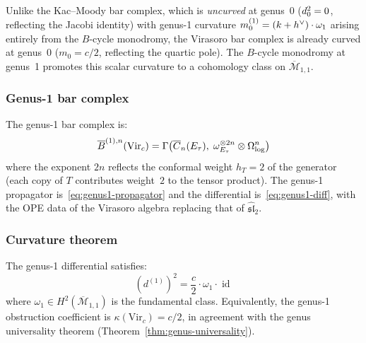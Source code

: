 Unlike the Kac--Moody bar complex, which is
\emph{uncurved} at genus~0 ($d_0^2 = 0$, reflecting the Jacobi identity) with
genus-1 curvature $m_0^{(1)} = (k+h^\vee)\cdot\omega_1$ arising entirely from the $B$-cycle
monodromy, the Virasoro bar complex is already curved at genus~0
($m_0 = c/2$, reflecting the quartic pole).  The $B$-cycle monodromy at
genus~1 promotes this scalar curvature to a cohomology class on
$\overline{\mathcal{M}}_{1,1}$.

\subsubsection{Genus-1 bar complex}

The genus-1 bar complex is:
\begin{equation}\label{eq:vir-genus1-bar}
\overline{B}^{(1),n}(\mathrm{Vir}_c) = \Gamma\bigl(\overline{C}_n(E_\tau),\;
  \omega_{E_\tau}^{\otimes 2n} \otimes \Omega^n_{\log}\bigr)
\end{equation}
where the exponent $2n$ reflects the conformal weight $h_T = 2$ of the
generator (each copy of $T$ contributes weight~$2$ to the tensor product).
The genus-1 propagator is~\eqref{eq:genus1-propagator}
and the differential is~\eqref{eq:genus1-diff}, with the OPE data of the
Virasoro algebra replacing that of $\widehat{\mathfrak{sl}}_2$.

\subsubsection{Curvature theorem}

\begin{theorem}
\label{thm:vir-genus1-curvature}
The genus-1 differential satisfies:
\begin{equation}\label{eq:vir-genus1-dsquared}
(d^{(1)})^2 = \frac{c}{2} \cdot \omega_1 \cdot \operatorname{id}
\end{equation}
where $\omega_1 \in H^2(\overline{\mathcal{M}}_{1,1})$ is the fundamental class.
Equivalently, the genus-1 obstruction coefficient is
$\kappa(\mathrm{Vir}_c) = c/2$, in agreement with the genus universality
theorem (Theorem~\ref{thm:genus-universality}).
\end{theorem}

